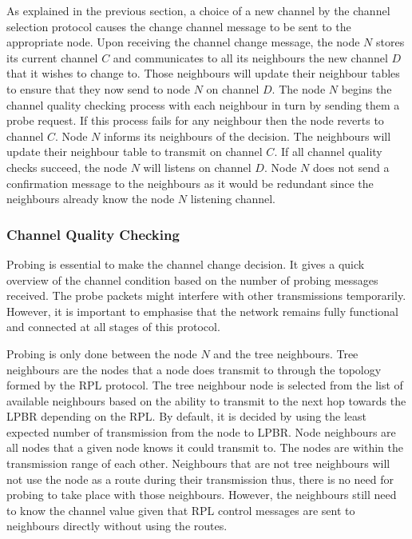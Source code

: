 As explained in the previous section, a choice of a new channel by the channel selection protocol causes the change channel message to be sent to the appropriate node. 
Upon receiving the channel change message, the node $N$ stores its current channel $C$ and communicates to all its neighbours the new channel $D$ that it wishes to change to. Those neighbours will update their neighbour tables to ensure that they now send to node $N$ on channel $D$.  The node $N$ begins the channel quality checking process with each neighbour in turn by sending them a probe request. If this process fails for any neighbour then the node reverts to channel $C$. Node $N$ informs its neighbours of the decision. The neighbours will update their neighbour table to transmit on channel $C$. If all channel quality checks succeed, the node $N$ will listens on channel $D$. Node $N$ does not send a confirmation message to the neighbours as it would be redundant since the neighbours already know the node $N$ listening channel. 

\subsubsection{Channel Quality Checking}
Probing is essential to make the channel change decision. It gives a quick overview of the channel condition based on the number of probing messages received. The probe packets might interfere with other transmissions temporarily. However, it is important to emphasise that the network remains fully functional and connected at all stages of this protocol.

Probing is only done between the node $N$ and the tree neighbours. Tree neighbours are the nodes that a node does transmit to through the topology formed by the RPL protocol. The tree neighbour node is selected from the list of available neighbours based on the ability to transmit to the next hop towards the LPBR depending on the RPL. By default, it is decided by using the least expected number of transmission from the node to LPBR. Node neighbours are all nodes that a given node knows it could transmit to. The nodes are within the transmission range of each other.
Neighbours that are not tree neighbours will not use the node as a route during their transmission thus, there is no need for probing to take place with those neighbours. However, the neighbours still need to know the channel value given that RPL control messages are sent to neighbours directly without using the routes.

